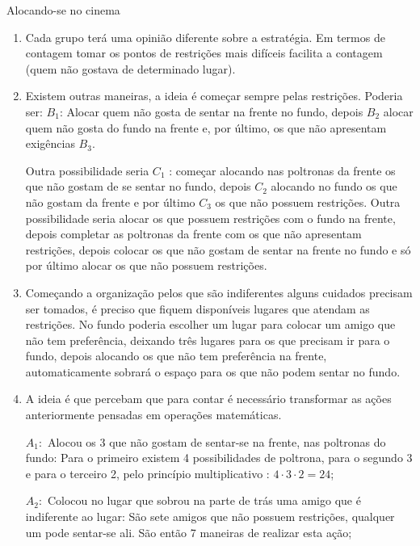 \begin{answer}{Alocando-se no cinema}
{
\begin{enumerate}
\item Cada grupo terá uma opinião diferente sobre a estratégia. Em termos de contagem tomar os  pontos de restrições mais difíceis facilita a contagem (quem não gostava de determinado lugar).

\item Existem outras maneiras, a ideia é começar sempre pelas restrições. Poderia ser: $B_1$: Alocar quem não gosta de sentar na frente no fundo, depois $B_2$ alocar quem não gosta do fundo na frente e, por último, os que não apresentam exigências $B_3$.  

Outra possibilidade seria $C_1$ : começar alocando nas poltronas da frente os que não gostam de se sentar no fundo, depois $C_2$ alocando no fundo os que não gostam da frente e por último $C_3$ os que não possuem restrições. Outra possibilidade seria alocar os que possuem restrições com o fundo na frente, depois completar as poltronas da frente com os que não apresentam restrições, depois colocar os que não gostam de sentar na frente no fundo e só por último alocar os que não possuem restrições. 

\item Começando a organização pelos que são indiferentes alguns cuidados precisam ser tomados, é preciso que fiquem disponíveis lugares que atendam as restrições. No fundo poderia escolher um lugar para colocar um amigo que não tem preferência, deixando três lugares para os que precisam ir para o fundo, depois alocando os que não tem preferência na frente, automaticamente sobrará o espaço para os que não podem sentar no fundo. 
\item A ideia é que percebam que para contar é necessário transformar as ações anteriormente pensadas em operações matemáticas. 

$A_1:$ Alocou os 3 que não gostam de sentar-se na frente, nas poltronas do fundo: Para o primeiro existem 4 possibilidades de poltrona, para o segundo 3 e para o terceiro 2, pelo princípio multiplicativo : $4\cdot 3 \cdot 2= 24$;

$A_2:$ Colocou no lugar que sobrou na parte de trás uma amigo que é indiferente ao lugar: São sete amigos que não possuem restrições, qualquer um pode sentar-se ali. São então 7 maneiras de realizar esta ação;


\end{enumerate}}
\end{answer}
